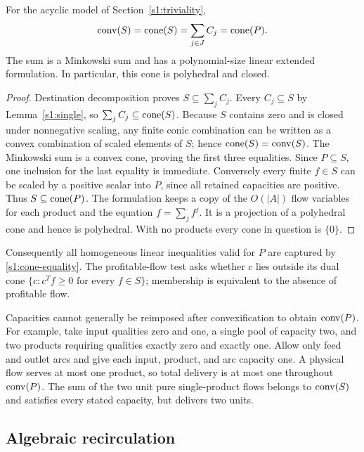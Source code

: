 \begin{theorem}\label{s1:cone-theorem}
For the acyclic model of Section~\ref{s1:triviality},
\begin{equation}
 \operatorname{conv}(S)=\operatorname{cone}(S)=\sum_{j\in J}C_j=\operatorname{cone}(P).\label{s1:cone-equality}
\end{equation}
The sum is a Minkowski sum and has a polynomial-size linear extended
formulation. In particular, this cone is polyhedral and closed.
\end{theorem}
\begin{proof}
Destination decomposition proves $S\subseteq\sum_jC_j$.
Every $C_j\subseteq S$ by Lemma~\ref{s1:single}, so
$\sum_jC_j\subseteq\operatorname{cone}(S)$. Because $S$ contains zero and is closed
under nonnegative scaling, any finite conic combination can be written
as a convex combination of scaled elements of $S$; hence
$\operatorname{cone}(S)=\operatorname{conv}(S)$. The Minkowski sum is a convex cone, proving the
first three equalities. Since $P\subseteq S$, one inclusion for the
last equality is immediate. Conversely every finite $f\in S$ can be
scaled by a positive scalar into $P$, since all retained capacities
are positive. Thus $S\subseteq\operatorname{cone}(P)$. The formulation keeps a copy
of the $O(|A|)$ flow variables for each product and the equation
$f=\sum_jf^j$. It is a projection of a polyhedral cone and hence is
polyhedral. With no products every cone in question is $\{0\}$.
\end{proof}

Consequently all homogeneous linear inequalities valid for $P$ are
captured by \eqref{s1:cone-equality}. The profitable-flow test asks whether
$c$ lies outside its dual cone
$\{c:c^Tf\ge0\text{ for every }f\in S\}$; membership is equivalent
to the absence of profitable flow.

Capacities cannot generally be reimposed after convexification to obtain
$\operatorname{conv}(P)$. For example, take input qualities zero and one, a single
pool of capacity two, and two products requiring qualities exactly zero
and exactly one. Allow only feed and outlet arcs and give each input,
product, and arc capacity one. A physical flow serves at most one
product, so total delivery is at most one throughout $\operatorname{conv}(P)$.
The sum of the two unit pure single-product flows belongs to
$\operatorname{conv}(S)$ and satisfies every stated capacity, but delivers two units.

\subsection{Algebraic recirculation}\label{s1:cycles}

